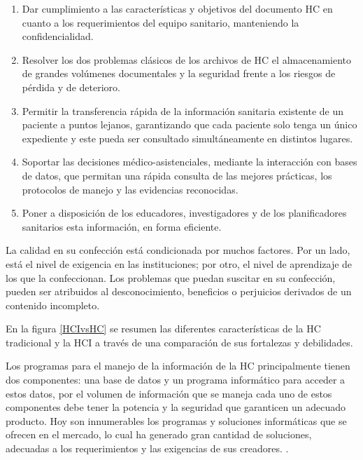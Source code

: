 \begin{enumerate}
	\item Dar cumplimiento a las características y objetivos del documento HC en cuanto a los requerimientos del equipo sanitario, manteniendo la confidencialidad.  
	
	\item Resolver los dos problemas clásicos de los archivos de HC el almacenamiento de grandes volúmenes documentales y la seguridad frente a los riesgos de pérdida y de deterioro.  
	
	\item Permitir la transferencia rápida de la información sanitaria existente de un paciente a puntos lejanos, garantizando que cada paciente solo tenga un único expediente y este pueda ser consultado simultáneamente en distintos lugares.  
	
	\item Soportar las decisiones médico-asistenciales, mediante la interacción con bases de datos, que permitan una rápida consulta de las mejores prácticas, los protocolos de manejo y las evidencias reconocidas.  
	
	\item Poner a disposición de los educadores, investigadores y de los planificadores sanitarios esta información, en forma eficiente. 
\end{enumerate}

La calidad en su confección está condicionada por muchos factores. Por un lado, está el nivel de exigencia en las instituciones; por otro, el nivel de aprendizaje de los que la confeccionan. Los problemas que puedan suscitar en su confección, pueden ser atribuidos al desconocimiento, beneficios o perjuicios derivados de un contenido incompleto. 

En la figura \ref{HCIvsHC} se resumen las diferentes características de la HC tradicional y la HCI a través de una comparación de sus fortalezas y debilidades.

 

Los programas para el manejo de la información de la HC principalmente tienen dos componentes: una base de datos y un programa informático para acceder a estos datos, por el volumen de información que se maneja cada uno de estos componentes debe tener la potencia y la seguridad que garanticen un adecuado producto. Hoy son innumerables los programas y soluciones informáticas que se ofrecen en el mercado, lo cual ha generado gran cantidad de soluciones, adecuadas a los requerimientos y las exigencias de sus creadores. .    
\newline

